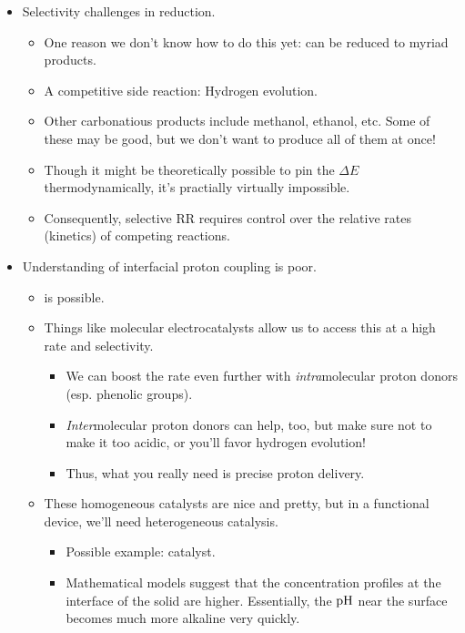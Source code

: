 \documentclass[../notes.tex]{subfiles}
\begin{document}
\begin{itemize}
\begin{itemize}
    \end{itemize}
    \item Selectivity challenges in  reduction.
    \begin{itemize}
        \item One reason we don't know how to do this yet:  can be reduced to myriad products.
        \item A competitive side reaction: Hydrogen evolution.
        \item Other carbonatious products include methanol, ethanol, etc. Some of these may be good, but we don't want to produce all of them at once!
        \item Though it might be theoretically possible to pin the $\Delta E$ thermodynamically, it's practially virtually impossible.
        \item Consequently, selective RR requires control over the relative rates (kinetics) of competing reactions.
    \end{itemize}
    \item Understanding of interfacial proton coupling is poor.
    \begin{itemize}
        \item {} is possible.
        \item Things like molecular electrocatalysts allow us to access this at a high rate and selectivity.
        \begin{itemize}
            \item We can boost the rate even further with \emph{intra}molecular proton donors (esp. phenolic groups).
            \item \emph{Inter}molecular proton donors can help, too, but make sure not to make it too acidic, or you'll favor hydrogen evolution!
            \item Thus, what you really need is precise proton delivery.
        \end{itemize}
        \item These homogeneous catalysts are nice and pretty, but in a functional device, we'll need heterogeneous catalysis.
        \begin{itemize}
            \item Possible example:  catalyst.
            \item Mathematical models suggest that the concentration profiles at the interface of the solid are higher. Essentially, the $\operatorname{pH}$ near the surface becomes much more alkaline very quickly.

\end{itemize}
\end{itemize}
\end{itemize}
\end{document}
